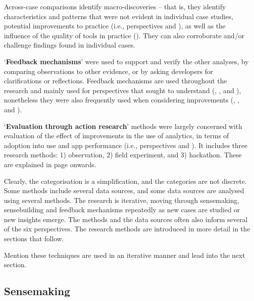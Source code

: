 Across-case comparisons identify macro-discoveries -- that is, they identify characteristics and patterns that were not evident in individual case studies, potential improvements to practice (i.e., perspectives \uuse and \iuse), as well as the influence of the quality of tools in practice (\itools). They can also corroborate and/or challenge findings found in individual cases.


`\textbf{Feedback mechanisms}' were used to support and verify the other analyses, by comparing observations to other evidence, or by asking developers for clarifications or reflections. Feedback mechanisms are used throughout the research and mainly used for perspectives that sought to understand (\uuse, \uartefacts, and \utools), nonetheless they were also frequently used when considering improvements (\iuse, \iartefacts, and \itools). 

`\textbf{Evaluation through action research}' methods were largely concerned with evaluation of the effect of improvements in the use of analytics, in terms of adoption into use and app performance (i.e., perspectives \iuse and \iartefacts). It includes three research methods: 1) observation, 2) field experiment, and 3) hackathon. These are explained in page \pageref{section-evaluation-through-action-research-method} onwards. 

\medskip
\dotfill
\medskip

Clearly, the categorisation is a simplification, and the categories are not discrete.  Some methods include several data sources, and some data sources are analysed using several methods. The research is iterative, moving through sensemaking, sensebuilding and feedback mechanisms repeatedly as new cases are studied or new insights emerge.  The methods and the data sources often also inform several of the six perspectives.  The research methods are introduced in more detail in the sections that follow.


Mention these techniques are used in an iterative manner and lead into the next section. 

\subsection{Sensemaking}

